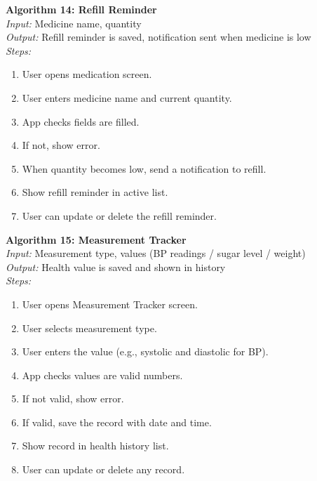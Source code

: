 \documentclass[12pt, a4paper, oneside]{report}
\begin{document}
\textbf{Algorithm 14: Refill Reminder}\\
\textit{Input:} Medicine name, quantity\\
\textit{Output:} Refill reminder is saved, notification sent when medicine is low\\
\textit{Steps:}
\begin{enumerate}
    \item User opens medication screen.
    \item User enters medicine name and current quantity.
    \item App checks fields are filled.
    \item If not, show error.
    \item When quantity becomes low, send a notification to refill.
    \item Show refill reminder in active list.
    \item User can update or delete the refill reminder.
\end{enumerate}

\textbf{Algorithm 15: Measurement Tracker}\\
\textit{Input:} Measurement type, values (BP readings / sugar level / weight)\\
\textit{Output:} Health value is saved and shown in history\\
\textit{Steps:}
\begin{enumerate}
    \item User opens Measurement Tracker screen.
    \item User selects measurement type.
    \item User enters the value (e.g., systolic and diastolic for BP).
    \item App checks values are valid numbers.
    \item If not valid, show error.
    \item If valid, save the record with date and time.
    \item Show record in health history list.
    \item User can update or delete any record.
\end{enumerate}
\end{document}
